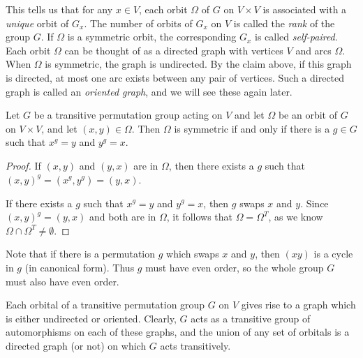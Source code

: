 This tells us that for any $x\in V$, each orbit $\Omega$ of $G$ on $V\times V$ is associated with a \textit{unique} orbit of $G_x$.  The number of orbits of $G_x$ on $V$ is called the \textit{rank} of the group $G$.  If $\Omega$ is a symmetric orbit, the corresponding $G_x$ is called \textit{self-paired}.  Each orbit $\Omega$ can be thought of as a directed graph with vertices $V$ and arcs $\Omega$.  When $\Omega$ is symmetric, the graph is undirected.  By the claim above, if this graph is directed, at most one arc exists between any pair of vertices.  Such a directed graph is called an \textit{oriented graph}, and we will see these again later.


\begin{lemma}
	Let $G$ be a transitive permutation group acting on $V$ and let $\Omega$ be an orbit of $G$ on $V\times V$, and let $(x,y)\in\Omega$.  Then $\Omega$ is symmetric if and only if there is a $g\in G$ such that $x^g=y$ and $y^g=x$.
\end{lemma}

\begin{proof}
	If $(x,y)$ and $(y,x)$ are in $\Omega$, then there exists a $g$ such that $(x,y)^g=(x^g,y^g)=(y,x)$.
	
	If there exists a $g$ such that $x^g=y$ and $y^g=x$, then $g$ swaps $x$ and $y$.  Since $(x,y)^g = (y,x)$ and both are in $\Omega$, it follows that $\Omega=\Omega^T$, as we know $\Omega\cap\Omega^T\neq \emptyset$.
\end{proof}



Note that if there is a permutation $g$ which swaps $x$ and $y$, then $(xy)$ is a cycle in $g$ (in canonical form).  Thus $g$ must have even order, so the whole group $G$ must also have even order.


Each orbital of a transitive permutation group $G$ on $V$ gives rise to a graph which is either undirected or oriented. Clearly, $G$ acts as a transitive group of automorphisms on each of these graphs, and the union of any set of orbitals is a directed graph (or not) on which  $G$ acts transitively.


